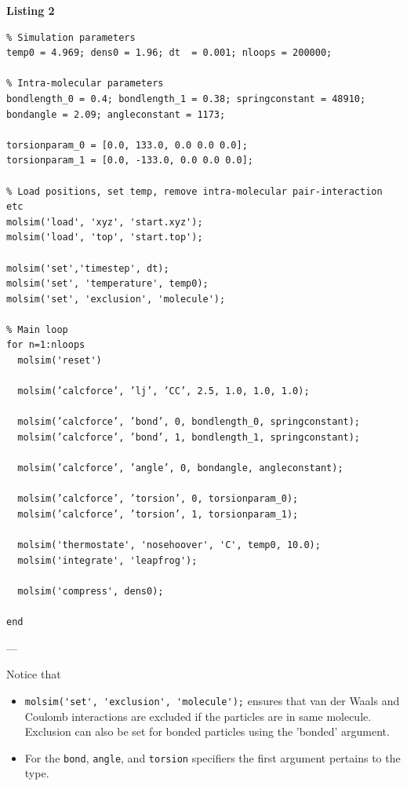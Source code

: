 \documentclass[11pt]{article}
\begin{document}
\noindent \textbf{Listing 2}
\begin{verbatim}
% Simulation parameters
temp0 = 4.969; dens0 = 1.96; dt  = 0.001; nloops = 200000;

% Intra-molecular parameters
bondlength_0 = 0.4; bondlength_1 = 0.38; springconstant = 48910;
bondangle = 2.09; angleconstant = 1173;

torsionparam_0 = [0.0, 133.0, 0.0 0.0 0.0]; 
torsionparam_1 = [0.0, -133.0, 0.0 0.0 0.0];

% Load positions, set temp, remove intra-molecular pair-interaction etc
molsim('load', 'xyz', 'start.xyz');
molsim('load', 'top', 'start.top');

molsim('set','timestep', dt);
molsim('set', 'temperature', temp0);
molsim('set', 'exclusion', 'molecule');

% Main loop
for n=1:nloops
  molsim('reset')

  molsim(’calcforce’, ’lj’, ’CC’, 2.5, 1.0, 1.0, 1.0);
  
  molsim(’calcforce’, ’bond’, 0, bondlength_0, springconstant);
  molsim(’calcforce’, ’bond’, 1, bondlength_1, springconstant);
  
  molsim(’calcforce’, ’angle’, 0, bondangle, angleconstant);

  molsim(’calcforce’, ’torsion’, 0, torsionparam_0);
  molsim(’calcforce’, ’torsion’, 1, torsionparam_1);
  
  molsim('thermostate', 'nosehoover', 'C', temp0, 10.0);
  molsim('integrate', 'leapfrog');

  molsim('compress', dens0);

end
\end{verbatim}

\noindent ---

\noindent Notice that
\begin{itemize}
\item \verb!molsim('set', 'exclusion', 'molecule');! ensures that van der Waals
  and Coulomb interactions are excluded if the particles are in same
  molecule. Exclusion can also be set for bonded particles using the 'bonded'
  argument. 
\item For the \verb!bond!, \verb!angle!, and \verb!torsion! specifiers the first
  argument pertains to the type.  
\end{itemize}
\end{document}
